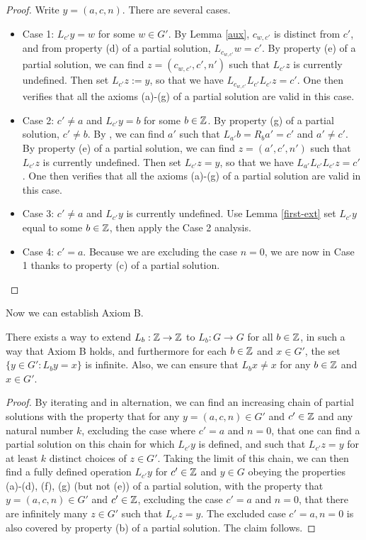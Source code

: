 \begin{proof} Write $y = (a,c,n)$. There are several cases.
  \begin{itemize}
    \item Case 1: $L_{c'} y = w$ for some $w \in G'$.  By Lemma \ref{aux}, $c_{w,c'}$ is distinct from $c'$, and from property (d) of a partial solution, $L_{c_{w,c'}} w = c'$.  By property (e) of a partial solution, we can find $z = (c_{w,c'}, c', n')$ such that $L_{c'} z$ is currently undefined.  Then set $L_{c'} z := y$, so that we have $L_{c_{w,c'}} L_{c'} L_{c'} z = c'$.  One then verifies that all the axioms (a)-(g) of a partial solution are valid in this case.
    \item Case 2: $c' \neq a$ and $L_{c'} y = b$ for some $b \in \mathbb{Z}$. By property (g) of a partial solution, $c' \neq b$.  By , we can find $a'$ such that $L_{a'} b = R_b a' = c'$ and $a' \neq c'$.  By property (e) of a partial solution, we can find $z = (a', c', n')$ such that $L_{c'} z$ is currently undefined.  Then set $L_{c'} z = y$, so that we have $L_{a'} L_{c'} L_{c'} z = c'$. One then verifies that all the axioms (a)-(g) of a partial solution are valid in this case.
    \item Case 3: $c' \neq a$ and $L_{c'} y$ is currently undefined.  Use Lemma \ref{first-ext} set $L_{c'} y$ equal to some $b \in \mathbb{Z}$, then apply the Case 2 analysis.
    \item Case 4: $c' = a$.  Because we are excluding the case $n=0$, we are now in Case 1 thanks to property (c) of a partial solution.
  \end{itemize}
\end{proof}


Now we can establish Axiom B.

\begin{proposition}\label{axiom-b}  There exists a way to extend $L_b: \mathbb{Z} \to \mathbb{Z}$ to $L_b: G \to G$ for all $b \in \mathbb{Z}$, in such a way that Axiom B holds, and furthermore for each $b \in \mathbb{Z}$ and $x \in G'$, the set $\{ y \in G': L_b y = x \}$ is infinite. Also, we can ensure that $L_b x \neq x$ for any $b \in \mathbb{Z}$ and $x \in G'$.
\end{proposition}

\begin{proof}
By iterating  and  in alternation, we can find an increasing chain of partial solutions with the property that for any $y = (a,c,n) \in G'$ and $c' \in \mathbb{Z}$ and any natural number $k$, excluding the case where $c'=a$ and $n=0$, that one can find a partial solution on this chain for which $L_{c'} y$ is defined, and such that $L_{c'} z = y$ for at least $k$ distinct choices of $z \in G'$.  Taking the limit of this chain, we can then find a fully defined operation $L_{c'} y$ for $c' \in \mathbb{Z}$ and $y \in G$ obeying the properties (a)-(d), (f), (g) (but not (e)) of a partial solution, with the property that
$y = (a,c,n) \in G'$ and $c' \in \mathbb{Z}$, excluding the case $c'=a$ and $n=0$, that there are infinitely many $z \in G'$ such that $L_{c'} z = y$.  The excluded case $c'=a, n=0$ is also covered by property (b) of a partial solution.  The claim follows.
\end{proof}

